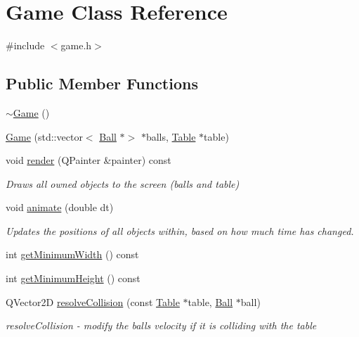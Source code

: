 \hypertarget{class_game}{}\section{Game Class Reference}
\label{class_game}


{\ttfamily \#include $<$game.\+h$>$}

\subsection*{Public Member Functions}
\begin{DoxyCompactItemize}
\item 
\mbox{\hyperlink{class_game_ae3d112ca6e0e55150d2fdbc704474530}{$\sim$\+Game}} ()
\item 
\mbox{\hyperlink{class_game_a1d3aba143e23c5b7bafda7852c2ce3b9}{Game}} (std\+::vector$<$ \mbox{\hyperlink{class_ball}{Ball}} $\ast$$>$ $\ast$balls, \mbox{\hyperlink{class_table}{Table}} $\ast$table)
\item 
void \mbox{\hyperlink{class_game_af80284dbc78f4829aeb0f2420373f605}{render}} (Q\+Painter \&painter) const
\begin{DoxyCompactList}\small\item\em Draws all owned objects to the screen (balls and table) \end{DoxyCompactList}\item 
void \mbox{\hyperlink{class_game_a40c08e2135ae529a820cdeeff32c5144}{animate}} (double dt)
\begin{DoxyCompactList}\small\item\em Updates the positions of all objects within, based on how much time has changed. \end{DoxyCompactList}\item 
int \mbox{\hyperlink{class_game_a0eee5d6dca8985da6e57bd548214a507}{get\+Minimum\+Width}} () const
\item 
int \mbox{\hyperlink{class_game_a0712183d4b571d7e3aeb60745b597abd}{get\+Minimum\+Height}} () const
\item 
Q\+Vector2D \mbox{\hyperlink{class_game_a8063ed6374c6bbadad0cbe71364fe764}{resolve\+Collision}} (const \mbox{\hyperlink{class_table}{Table}} $\ast$table, \mbox{\hyperlink{class_ball}{Ball}} $\ast$ball)
\begin{DoxyCompactList}\small\item\em resolve\+Collision -\/ modify the ball\textquotesingle{}s velocity if it is colliding with the table \end{DoxyCompactList}\item 
$$
\end{DoxyCompactItemize}
